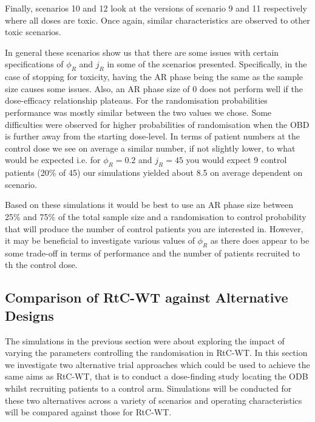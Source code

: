 Finally, scenarios 10 and 12 look at the versions of scenario 9 and 11 respectively where all doses are toxic. Once again, similar characteristics are observed to other toxic scenarios. 

In general these scenarios show us that there are some issues with certain specifications of $\phi_R$ and $j_R$ in some of the scenarios presented. Specifically, in the case of stopping for toxicity, having the AR phase being the same as the sample size causes some issues. Also, an AR phase size of 0 does not perform well if the dose-efficacy relationship plateaus. For the randomisation probabilities performance was mostly similar between the two values we chose. Some difficulties were observed for higher probabilities of randomisation when the OBD is further away from the starting dose-level. In terms of patient numbers at the control dose we see on average a similar number, if not slightly lower, to what would be expected i.e. for $\phi_R = 0.2$ and  $j_R = 45$ you would expect 9 control patients (20\% of 45) our simulations yielded about 8.5 on average dependent on scenario. 

Based on these simulations it would be best to use an AR phase size between 25\% and 75\% of the total sample size and a randomisation to control probability that will produce the number of control patients you are interested in. However, it may be beneficial to investigate various values of $\phi_R$ as there does appear to be some trade-off in terms of performance and the number of patients recruited to th the control dose.




 \subsection{Comparison of RtC-WT against Alternative Designs }
 \label{WT:CompAltDesigns}
 
 The simulations in the previous section were about exploring the impact of varying the parameters controlling the randomisation in RtC-WT. In this section we investigate two alternative trial approaches which could be used to achieve the same aims as RtC-WT, that is to conduct a dose-finding study locating the ODB whilst recruiting patients to a control arm. Simulations will be conducted for these two alternatives across a variety of scenarios and operating characteristics will be compared against those for RtC-WT.       
 

